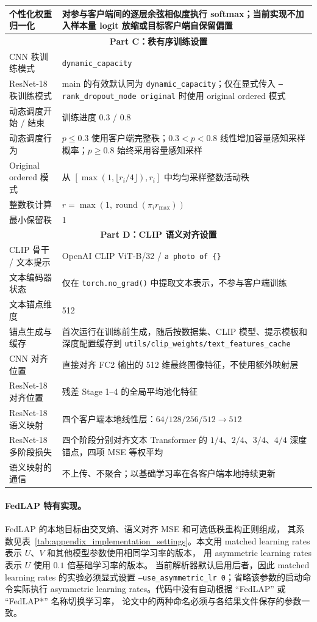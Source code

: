 \begin{table}[t]
\begin{tabularx}{\textwidth}{@{}p{4.8cm}X@{}}
个性化权重归一化 & 对参与客户端间的逐层余弦相似度执行 softmax；当前实现不加入样本量 logit 放缩或目标客户端自保留偏置 \\
\midrule
\multicolumn{2}{c}{\textbf{Part C：秩有序训练设置}} \\
\midrule
CNN 秩训练模式 & \texttt{dynamic\_capacity} \\
ResNet-18 秩训练模式 & main 的有效默认同为 \texttt{dynamic\_capacity}；仅在显式传入 \texttt{--rank\_dropout\_mode original} 时使用 original ordered 模式 \\
动态调度开始 / 结束 & 训练进度 0.3 / 0.8 \\
动态调度行为 & $p\leq0.3$ 使用客户端完整秩；$0.3<p<0.8$ 线性增加容量感知采样概率；$p\geq0.8$ 始终采用容量感知采样 \\
Original ordered 模式 & 从 $[\max(1,\lfloor r_i/4\rfloor),r_i]$ 中均匀采样整数活动秩 \\
整数秩计算 & $r=\max(1,\operatorname{round}(\pi_i r_{\max}))$ \\
最小保留秩 & 1 \\
\midrule
\multicolumn{2}{c}{\textbf{Part D：CLIP 语义对齐设置}} \\
\midrule
CLIP 骨干 / 文本提示 & OpenAI CLIP ViT-B/32 / \texttt{a photo of \{\}} \\
文本编码器状态 & 仅在 \texttt{torch.no\_grad()} 中提取文本表示，不参与客户端训练 \\
文本锚点维度 & 512 \\
锚点生成与缓存 & 首次运行在训练前生成，随后按数据集、CLIP 模型、提示模板和深度配置缓存到 \texttt{utils/clip\_weights/text\_features\_cache} \\
CNN 对齐位置 & 直接对齐 FC2 输出的 512 维最终图像特征，不使用额外映射层 \\
ResNet-18 对齐位置 & 残差 Stage 1--4 的全局平均池化特征 \\
ResNet-18 语义映射 & 四个客户端本地线性层：$64/128/256/512\rightarrow512$ \\
ResNet-18 多阶段损失 & 四个阶段分别对齐文本 Transformer 的 $1/4$、$2/4$、$3/4$、$4/4$ 深度锚点，四项 MSE 等权平均 \\
语义映射的通信 & 不上传、不聚合；以基础学习率在各客户端本地持续更新 \\
\bottomrule
\end{tabularx}
\end{table}

\paragraph{FedLAP 特有实现。}
FedLAP 的本地目标由交叉熵、语义对齐 MSE 和可选低秩重构正则组成，
其系数见表~\ref{tab:appendix_implementation_settings}。本文用
matched learning rates 表示 $U$、$V$ 和其他模型参数使用相同学习率的版本，
用 asymmetric learning rates 表示 $U$ 使用 $0.1$ 倍基础学习率的版本。
当前解析器默认启用后者，因此 matched learning rates 的实验必须显式设置
\texttt{--use\_asymmetric\_lr 0}；省略该参数的启动命令实际执行 asymmetric
learning rates。代码中没有自动根据 ``FedLAP'' 或 ``FedLAP*'' 名称切换学习率，
论文中的两种命名必须与各结果文件保存的参数一致。

